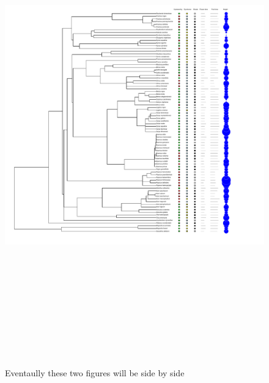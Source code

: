 \documentclass{article}\usepackage[]{graphicx}\usepackage[]{color}
\begin{document}
\begin{figure}[h!]
\includegraphics[width=20cm, height=20cm]{../figure/silvics_phylo_alltraits.pdf}\\
\caption{Eventaully these two figures will be side by side}
\end{figure}
\end{document}
